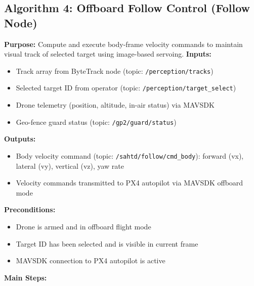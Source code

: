 \documentclass[12pt,a4paper]{report}
\begin{document}
\subsection{Algorithm 4: Offboard Follow Control (Follow Node)}
\textbf{Purpose:} Compute and execute body-frame velocity commands to maintain visual track of selected target using image-based servoing.
\textbf{Inputs:}
\begin{itemize}
    \item Track array from ByteTrack node (topic: \texttt{/perception/tracks})
    \item Selected target ID from operator (topic: \texttt{/perception/target\_select})
    \item Drone telemetry (position, altitude, in-air status) via \ac{MAVSDK}
    \item Geo-fence guard status (topic: \texttt{/gp2/guard/status})
\end{itemize}
\textbf{Outputs:}
\begin{itemize}
    \item Body velocity command (topic: \texttt{/sahtd/follow/cmd\_body}): forward (vx), lateral (vy), vertical (vz), yaw rate
    \item Velocity commands transmitted to \ac{PX4} autopilot via \ac{MAVSDK} offboard mode
\end{itemize}
\textbf{Preconditions:}
\begin{itemize}
    \item Drone is armed and in offboard flight mode
    \item Target ID has been selected and is visible in current frame
    \item \ac{MAVSDK} connection to \ac{PX4} autopilot is active
\end{itemize}
\textbf{Main Steps:}
\end{document}
